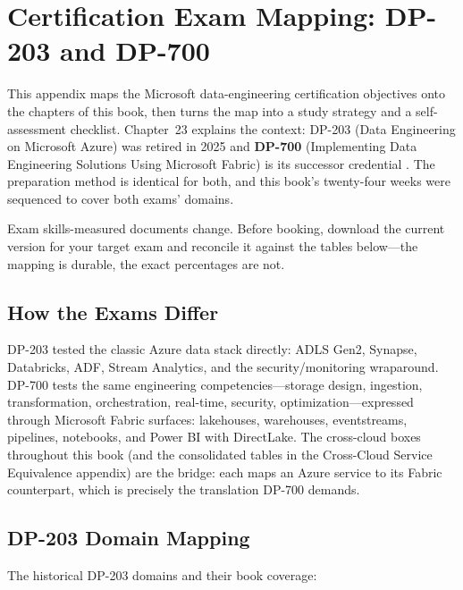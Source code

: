\chapter{Certification Exam Mapping: DP-203 and DP-700}
%
This appendix maps the Microsoft data-engineering certification objectives onto the chapters of
this book, then turns the map into a study strategy and a self-assessment checklist. Chapter~23
explains the context: DP-203 (Data Engineering on Microsoft Azure) was retired in 2025 and
\textbf{DP-700} (Implementing Data Engineering Solutions Using Microsoft Fabric) is its successor
credential \cite{microsoft2025dp203,microsoft2025dp700}. The preparation method is identical for
both, and this book's twenty-four weeks were sequenced to cover both exams' domains.

\begin{notebox}
Exam skills-measured documents change. Before booking, download the current version for your
target exam and reconcile it against the tables below---the mapping is durable, the exact
percentages are not.
\end{notebox}

\section{How the Exams Differ}
DP-203 tested the classic Azure data stack directly: ADLS Gen2, Synapse, Databricks, ADF,
Stream Analytics, and the security/monitoring wraparound. DP-700 tests the same engineering
competencies---storage design, ingestion, transformation, orchestration, real-time, security,
optimization---expressed through Microsoft Fabric surfaces: lakehouses, warehouses, eventstreams,
pipelines, notebooks, and Power BI with DirectLake. The cross-cloud boxes throughout this book
(and the consolidated tables in the Cross-Cloud Service Equivalence appendix) are the bridge:
each maps an Azure service to its Fabric counterpart, which is precisely the translation DP-700
demands.

\section{DP-203 Domain Mapping}
%
The historical DP-203 domains and their book coverage:

